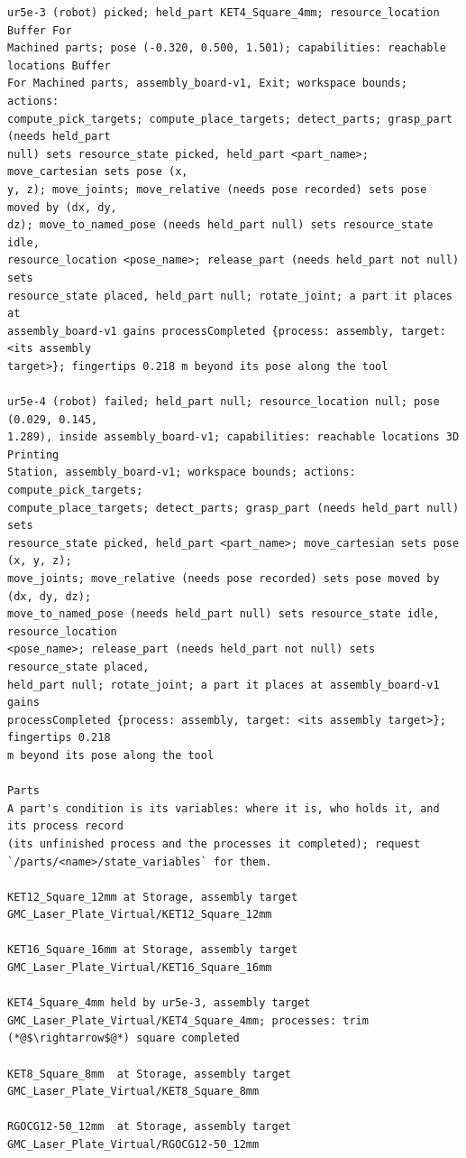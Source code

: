 \documentclass[preprint,12pt,authoryear]{elsarticle}
\begin{document}
\begin{lstlisting}[style=recorded]
ur5e-3 (robot) picked; held_part KET4_Square_4mm; resource_location Buffer For
Machined parts; pose (-0.320, 0.500, 1.501); capabilities: reachable locations Buffer
For Machined parts, assembly_board-v1, Exit; workspace bounds; actions:
compute_pick_targets; compute_place_targets; detect_parts; grasp_part (needs held_part
null) sets resource_state picked, held_part <part_name>; move_cartesian sets pose (x,
y, z); move_joints; move_relative (needs pose recorded) sets pose moved by (dx, dy,
dz); move_to_named_pose (needs held_part null) sets resource_state idle,
resource_location <pose_name>; release_part (needs held_part not null) sets
resource_state placed, held_part null; rotate_joint; a part it places at
assembly_board-v1 gains processCompleted {process: assembly, target: <its assembly
target>}; fingertips 0.218 m beyond its pose along the tool

ur5e-4 (robot) failed; held_part null; resource_location null; pose (0.029, 0.145,
1.289), inside assembly_board-v1; capabilities: reachable locations 3D Printing
Station, assembly_board-v1; workspace bounds; actions: compute_pick_targets;
compute_place_targets; detect_parts; grasp_part (needs held_part null) sets
resource_state picked, held_part <part_name>; move_cartesian sets pose (x, y, z);
move_joints; move_relative (needs pose recorded) sets pose moved by (dx, dy, dz);
move_to_named_pose (needs held_part null) sets resource_state idle, resource_location
<pose_name>; release_part (needs held_part not null) sets resource_state placed,
held_part null; rotate_joint; a part it places at assembly_board-v1 gains
processCompleted {process: assembly, target: <its assembly target>}; fingertips 0.218
m beyond its pose along the tool

Parts
A part's condition is its variables: where it is, who holds it, and its process record
(its unfinished process and the processes it completed); request
`/parts/<name>/state_variables` for them.

KET12_Square_12mm at Storage, assembly target
GMC_Laser_Plate_Virtual/KET12_Square_12mm

KET16_Square_16mm at Storage, assembly target
GMC_Laser_Plate_Virtual/KET16_Square_16mm

KET4_Square_4mm held by ur5e-3, assembly target
GMC_Laser_Plate_Virtual/KET4_Square_4mm; processes: trim (*@$\rightarrow$@*) square completed

KET8_Square_8mm  at Storage, assembly target GMC_Laser_Plate_Virtual/KET8_Square_8mm

RGOCG12-50_12mm  at Storage, assembly target GMC_Laser_Plate_Virtual/RGOCG12-50_12mm


\end{lstlisting}
\end{document}
